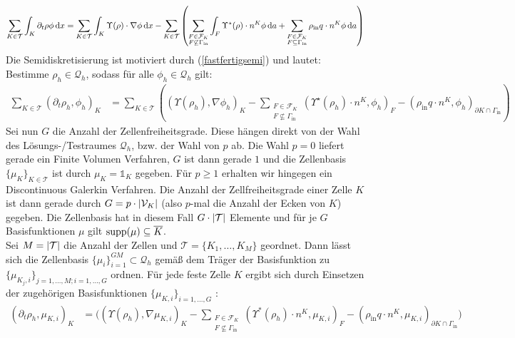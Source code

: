 \begin{align}
	\label{fastfertigsemi}
	\sum_{K \in \mathcal{T}} \int_K \partial_t \rho  \phi \, \mathrm{d} x = \sum_{K \in \mathcal{T}} \int_K \Upsilon(\rho ) \cdot \nabla \phi \, \mathrm{d} x - 	\sum_{K\in \mathcal{T}} \left( \sum_{\substack{F \in \mathcal{F}_K \\ F \not\subseteq \Gamma_{\text{in}}}} \int_F \Upsilon^{\star}(\rho) \cdot n^K \phi \, \mathrm{d} a + \sum_{\substack{F \in \mathcal{F}_K \\ F \subseteq \Gamma_{\text{in}}}} \rho_{\text{in}} q \cdot n^K \phi \, \mathrm{d} a \right)
\end{align}
 Die Semidiskretisierung ist motiviert durch (\ref{fastfertigsemi}) und lautet: Bestimme  $\rho_h \in \mathcal{Q}_h$, sodass für alle $ \phi_h \in \mathcal{Q}_h $ gilt:
\begin{align}
	\label{Semidiskretisierung}
	\sum_{K \in \mathcal{T}} (\partial_t \rho_h, \phi_h)_{K} &= \sum_{K \in \mathcal{T}} \left( (\Upsilon(\rho_h), \nabla \phi_h)_{K} - \sum_{\substack{F \in \mathcal{F}_K \\ F \not \subseteq \Gamma_{\text{in}}}}(\Upsilon^{\star}(\rho_h)\cdot n^K,\phi_h)_{F} - (\rho_{\text{in}}q \cdot n^K,\phi_h)_{\partial K \cap \Gamma_{\text{in}}} \right)
\end{align}
 Sei nun $ G $ die Anzahl der Zellenfreiheitsgrade. Diese hängen direkt von der Wahl des Lösungs-/Testraumes $ \mathcal{Q}_h $, bzw. der Wahl von $ p $ ab. Die Wahl $ p=0 $ liefert gerade ein Finite Volumen Verfahren, $ G $ ist dann gerade $ 1 $ und die Zellenbasis $ \{\mu_K \}_{K \in \mathcal{T}}$ ist durch $ \mu_K =  \mathds{1}_{K} $ gegeben.
 Für $ p \geq 1 $ erhalten wir hingegen ein Discontinuous Galerkin Verfahren. Die Anzahl der Zellfreiheitsgrade einer Zelle $ K $ ist dann gerade durch $ G = p \cdot | \mathcal{V}_K | $ (also $ p $-mal die Anzahl der Ecken von $ K $) gegeben.
 Die Zellenbasis hat in diesem Fall $ G \cdot | \mathcal{T} | $ Elemente und für je $ G $ Basisfunktionen $ \mu $ gilt $ \operatorname{supp}(\mu) \subseteq \overline{K} $. \\
 Sei $ M = | \mathcal{T} | $ die Anzahl der Zellen und $ \mathcal{T} = \{K_1,\dots,K_M \} $ geordnet. Dann lässt sich die Zellenbasis $ \{ \mu_i \}_{i=1}^{GM} \subset \mathcal{Q}_h $ gemäß dem Träger der Basisfunktion zu $ \{ \mu_{K_j,i} \}_{j = 1,\dots,M ; i = 1,\dots,G } $ ordnen.
 Für jede feste Zelle $ K $ ergibt sich durch Einsetzen der zugehörigen Basisfunktionen $ \{ \mu_{K,i} \}_{i = 1,\dots,G }  $ : \\
\begin{align*} 
\left(\partial_t \rho_h, \mu_{K,i}  \right)_{K}  &= \bigg( \left(\Upsilon(\rho_h), \nabla\mu_{K,i}\right)_{K} - \sum_{\substack{F \in \mathcal{F}_{K} \\ F \not\subseteq \Gamma_{\text{in}}}} \left(\Upsilon^*(\rho_h) \cdot n^{K}, \mu_{K,i} \right)_{F} - \left(\rho_{\text{in}} q \cdot n^{K}, \mu_{K,i} \right)_{\partial K \cap \Gamma_{\text{in}}} \bigg) \\
\end{align*}
